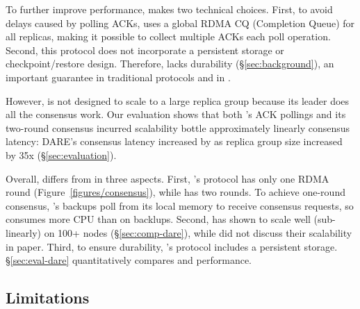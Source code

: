 % 


To further improve performance, \dare makes two technical choices. First, to 
avoid delays caused by polling ACKs, \dare uses a global RDMA CQ (Completion 
Queue) for all replicas, making it possible to collect multiple ACKs each poll 
operation. Second, this protocol does not incorporate a persistent storage or 
checkpoint/restore design. Therefore, \dare lacks durability 
(\S\ref{sec:background}), an important guarantee in traditional \paxos 
protocols and in \xxx.


However, \dare is not designed to scale to a large replica group because its 
leader does all the consensus work. Our evaluation shows that both \dare's ACK 
pollings and its two-round consensus incurred scalability bottle approximately 
linearly consensus latency: DARE's consensus latency increased by 
\darescalability as replica group size increased by 35x 
(\S\ref{sec:evaluation}).

Overall, \xxx differs from \dare in three aspects. First, \xxx's protocol has 
only one RDMA round (Figure~\ref{figures/consensus}), while \dare has two 
rounds. To achieve one-round consensus, \xxx's backups poll from its local 
memory to receive consensus requests, so \xxx consumes more CPU than \dare on 
backlups. Second, \xxx has shown to scale well (sub-linearly) on 100+ nodes 
(\S\ref{sec:comp-dare}), while \dare did not discuss their scalability in paper. 
Third, to ensure durability, \xxx's protocol includes a persistent storage. 
\S\ref{sec:eval-dare} quantitatively compares \xxx and \dare performance.

\subsection{\xxx Limitations}\label{sec:limits}

